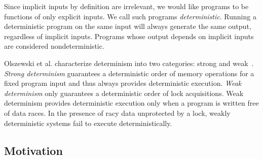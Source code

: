 Since implicit inputs by definition are irrelevant, we would like programs to be
functions of only explicit inputs. We call such programs \emph{deterministic}.
Running a deterministic program on the same input will always generate the same
output, regardless of implicit inputs. Programs whose output depends on
implicit inputs are considered nondeterministic.

Olszewski et al. characterize determinism into two categories: strong and
weak~\cite{olszewski2009kendo}. \emph{Strong determinism} guarantees a
deterministic order of memory operations for a fixed program input and thus
always provides deterministic execution. \emph{Weak determinism} only guarantees
a deterministic order of lock acquisitions. Weak determinism provides
deterministic execution only when a program is written free of data races. In
the presence of racy data unprotected by a lock, weakly deterministic systems
fail to execute deterministically.

\iffalse
\paragraph{A New Programming Model}
\fi

\iffalse

Parallel programming languages, like DPJ~\cite{bocchino2009type}, provide
deterministic execution; however, since these languages require rewriting
existing programs and have limited potential for wide uptake, we shall not
consider such systems. We also will not consider systems that require
specialized hardware like DMP~\cite{Devietti09}.
We would like a deterministic environment that runs on standard
computer hardware written in popular, convention programming languages like C.

We focus on systems that run programs deterministically written in conventional
languages, like C. Kendo is a weakly deterministic runtime
library~\cite{olszewski2009kendo} for C++ applications.
CoreDet\~cite{bergan2010coredet} provides strong determinism via a compiler
and runtime library.

Even though we consider some inputs to be nondeterministic (like
{\tt gettimeofday()}), these inputs are often semantically relevant to a
program. Thus, we focus our efforts on nondeterministic implicit inputs.

\fi

\subsection{Motivation}

